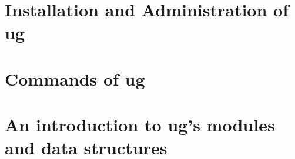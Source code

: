 \newpage
{
\small
\tableofcontents
}
\clearpage

\pagestyle{plain}
\section{Installation and Administration of ug}
\renewcommand{\sectitle}{Installation and Administration}


\pagestyle{plain}
\section{Commands of ug}
\renewcommand{\sectitle}{Commands}


\pagestyle{plain}
\section{An introduction to ug's modules and data structures}
\renewcommand{\sectitle}{modules and data structures}



